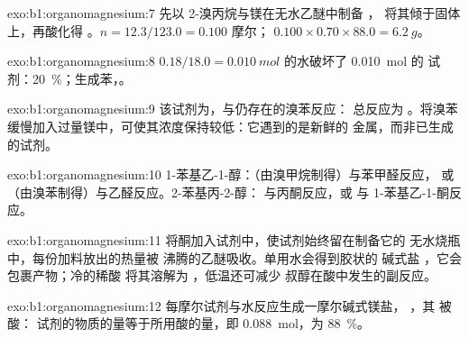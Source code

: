 \begin{solution}{exo:b1:organomagnesium:7}
先以 2-溴丙烷与镁在无水乙醚中制备 ，
将其倾于固体  上，再酸化得 。$n = 12.3/123.0 = 0.100$ 摩尔；
$0.100 \times 0.70 \times 88.0 = \qty{6.2}{g}$。
\end{solution}

\begin{solution}{exo:b1:organomagnesium:8}
$0.18/18.0 = \qty{0.010}{mol}$ 的水破坏了 \qty{0.010}{mol} 的
试剂：\qty{20}{\percent}；生成苯，。
\end{solution}

\begin{solution}{exo:b1:organomagnesium:9}
该试剂为，与仍存在的溴苯反应：
总反应为 。将溴苯
缓慢加入过量镁中，可使其浓度保持较低：它遇到的是新鲜的
金属，而非已生成的试剂。
\end{solution}

\begin{solution}{exo:b1:organomagnesium:10}
1-苯基乙-1-醇：（由溴甲烷制得）与苯甲醛反应，
或 （由溴苯制得）与乙醛反应。2-苯基丙-2-醇：
 与丙酮反应，或  与
1-苯基乙-1-酮反应。
\end{solution}

\begin{solution}{exo:b1:organomagnesium:11}
将酮加入试剂中，使试剂始终留在制备它的
无水烧瓶中，每份加料放出的热量被
沸腾的乙醚吸收。单用水会得到胶状的
碱式盐 ，它会包裹产物；冷的稀酸
将其溶解为 ，低温还可减少
叔醇在酸中发生的副反应。
\end{solution}

\begin{solution}{exo:b1:organomagnesium:12}
每摩尔试剂与水反应生成一摩尔碱式镁盐，
，其  被酸：
试剂的物质的量等于所用酸的量，即 \qty{0.088}{mol}，为
\qty{88}{\percent}。
\end{solution}

